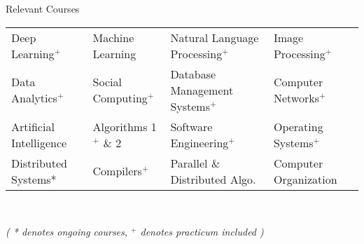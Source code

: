 \documentclass{resume} %
\begin{document}
\begin{rSection}{Relevant Courses}
\begin{tabular}{p{3.7cm} p{3.5cm} p{5.7cm} p{4.1cm}}
Deep Learning$^+$ & Machine Learning & Natural Language Processing$^+$ & Image Processing$^+$ \\
Data Analytics$^+$ & Social Computing$^+$ & Database Management Systems$^+$ & Computer Networks$^+$  \\
Artificial Intelligence & Algorithms 1$^+$ \& 2 & Software Engineering$^+$ & Operating Systems$^+$ \\
Distributed Systems* & Compilers$^+$ & Parallel \& Distributed Algo. & Computer Organization\\
\end{tabular}\\
\centerline{\footnotesize \textit{ ( * denotes ongoing courses, $^+$ denotes practicum included )  }}
\end{rSection}

\end{document}
